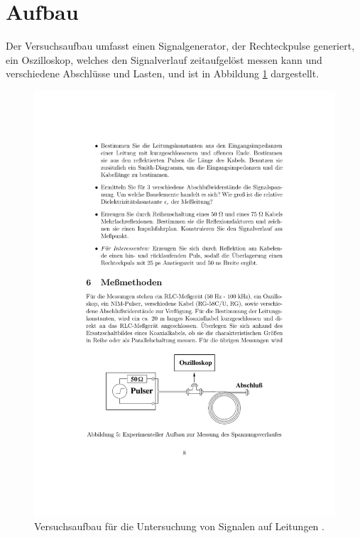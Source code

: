 \section{Aufbau} %
\label{sec:aufbau}
Der Versuchsaufbau umfasst einen Signalgenerator, der Rechteckpulse generiert,
ein Oszilloskop, welches den Signalverlauf zeitaufgelöst messen kann und
verschiedene Abschlüsse und Lasten, und ist in Abbildung \ref{fig:aufbau}
dargestellt.
\begin{figure}
    \centering
    \includegraphics[width=0.7\linewidth]{img/aufbau.pdf}
    \caption{
        Versuchsaufbau für die Untersuchung von Signalen auf Leitungen
        \cite{E02}.
    }
    \label{fig:aufbau}
\end{figure}


